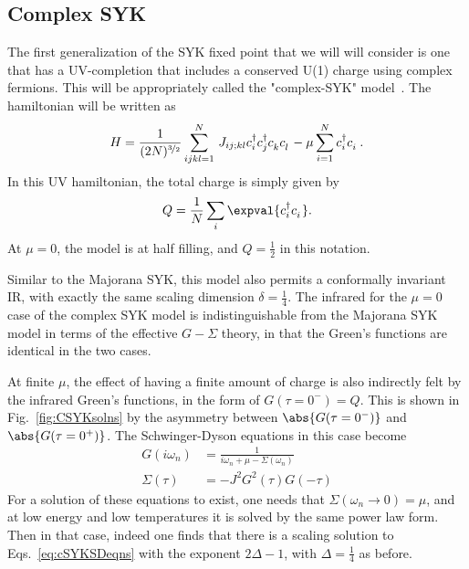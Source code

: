 \subsection{Complex SYK}
The first generalization of the SYK fixed point that we will will consider is one that has a UV-completion that includes a conserved U(1) charge using complex fermions. This will be appropriately called the "complex-SYK" model~\cite{sachdev2015bekenstein,gu_notes_2020}. The hamiltonian will be written as 
\begin{align}
    H = \frac{1}{(2N)^{\nicefrac{3}{2}}}\displaystyle\sum_{ijkl = 1}^N\,J_{ij;kl}c^\dagger_ic^\dagger_jc^{\phantom{\dagger}}_kc^{\phantom{\dagger}}_l - \mu\sum_{i=1}^N c^\dagger_ic^{\phantom{\dagger}}_i \, .
\end{align}
In this UV hamiltonian, the total charge is simply given by 
\begin{align}
    Q = \frac{1}{N}\sum_i \expval{c^\dagger_i c^{\phantom{\dagger}}_i} .
    \label{eq:chargeUV_syk}
\end{align}
At $\mu = 0$, the model is at half filling, and $Q = \frac{1}{2}$ in this notation. 
\par
Similar to the Majorana SYK, this model also permits a conformally invariant IR, with exactly the same scaling dimension $\delta = \frac{1}{4}$. The infrared for the $\mu = 0$ case of the complex SYK model is indistinguishable from the Majorana SYK model in terms of the effective $G-\Sigma$ theory, in that the Green's functions are identical in the two cases. 
\par
At finite $\mu$, the effect of having a finite amount of charge is also indirectly felt by the infrared Green's functions, in the form of $G(\tau = 0^-) = Q$. This is shown in Fig.~\ref{fig:CSYKsolns} by the asymmetry between $\abs{G(\tau = 0^-)}$ and $\abs{G(\tau = 0^+)}$.
The Schwinger-Dyson equations in this case become~\cite{sachdev2015bekenstein}
\begin{subequations}
\begin{align}
    G(i\omega_n) &= \frac{1}{i\omega_n + \mu -\Sigma(\omega_n)} \\
    \Sigma(\tau) &= -J^2 G^2(\tau)G(-\tau)
    \label{eq:cSYKSDeqns}
\end{align}
\end{subequations}
For a solution of these equations to exist, one needs that $\Sigma(\omega_n \rightarrow 0) = \mu$, and at low energy and low temperatures it is solved by the same power law form. Then in that case, indeed one finds that there is a scaling solution to Eqs.~\eqref{eq:cSYKSDeqns} with the exponent $2\Delta - 1$, with $\Delta = \frac{1}{4}$ as before. 

